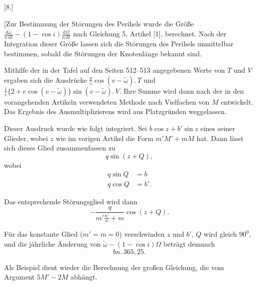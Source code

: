 \clearpage
\begin{landscape}
\begingroup
\fontsize{10}{13}\selectfont
{}
\renewcommand{\headrulewidth}{0pt}
\begin{center}[8.]\end{center}
\par\noindent\hspace*{\parindent}[Zur Bestimmung der Störungen des Perihels wurde die Größe \(\frac{\mathrm{d}\tilde\omega}{n\,\mathrm{d}t}-(1-\cos i)\frac{\mathrm{d}\Omega}{n\,\mathrm{d}t}\) nach Gleichung 5, Artikel [1], berechnet. Nach der Integration dieser Größe lassen sich die Störungen des Perihels unmittelbar bestimmen, sobald die Störungen der Knotenlänge bekannt sind.
\par\noindent\hspace*{\parindent}Mithilfe der in der Tafel auf den Seiten 512--513 angegebenen Werte von \(T\) und \(V\) ergaben sich die Ausdrücke \(\frac{p}{e}\cos(v-\tilde\omega)\mathord{.}\,T\) und \(\frac{1}{e}\{2+e\cos(v-\tilde\omega)\}\sin(v-\tilde\omega)\mathord{.}\,V\). Ihre Summe wird dann nach der in den vorangehenden Artikeln verwendeten Methode nach Vielfachen von \(M\) entwickelt. Das Ergebnis des Ausmultiplizierens wird aus Platzgründen weggelassen.
\par\noindent\hspace*{\parindent}Dieser Ausdruck wurde wie folgt integriert. Sei \(b\cos z+b'\sin z\) eines seiner Glieder, wobei \(z\) wie im vorigen Artikel die Form \(m'M'+mM\) hat. Dann lässt sich dieses Glied zusammenfassen zu
\[
q\sin(z+Q),
\]
\noindent wobei
\[
\begin{aligned}
q\sin Q&=b\\
q\cos Q&=b'.
\end{aligned}
\]
\par\noindent\hspace*{\parindent}Das entsprechende Störungsglied wird dann
\[
-\frac{q}{m'\frac{n'}{n}+m}\cos(z+Q).
\]
\par\noindent\hspace*{\parindent}Für das konstante Glied (\(m'=m=0\)) verschwinden \(z\) und \(b'\), \(Q\) wird gleich \(90^0\), und die jährliche Änderung von \(\tilde\omega-(1-\cos i)\Omega\) beträgt demnach
\[
bn\mathord{.}\,365{,}25.
\]
\par\noindent\hspace*{\parindent}Als Beispiel dient wieder die Berechnung der großen Gleichung, die vom Argument \(5M'-2M\) abhängt.

\end{landscape}
